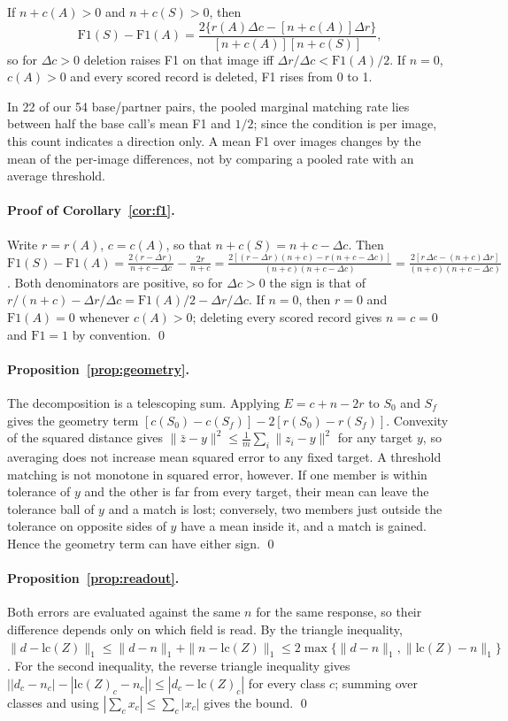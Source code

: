 \begin{corollary}\label{cor:f1}
If $n+c(A)>0$ and $n+c(S)>0$, then
\[
\mathrm{F1}(S)-\mathrm{F1}(A)=\frac{2\{r(A)\Delta c-[n+c(A)]\Delta r\}}{[n+c(A)][n+c(S)]},
\]
so for $\Delta c>0$ deletion raises F1 on that image iff $\Delta r/\Delta c<\mathrm{F1}(A)/2$. If $n=0$, $c(A)>0$ and every scored record is deleted, F1 rises from 0 to 1.
\end{corollary}
In 22 of our 54 base/partner pairs, the pooled marginal matching rate lies between half the base call's mean F1 and $1/2$; since the condition is per image, this count indicates a direction only. A mean F1 over images changes by the mean of the per-image differences, not by comparing a pooled rate with an average threshold.

\paragraph{Proof of Corollary~\ref{cor:f1}.} Write $r=r(A)$, $c=c(A)$, so that $n+c(S)=n+c-\Delta c$. Then $\mathrm{F1}(S)-\mathrm{F1}(A)=\frac{2(r-\Delta r)}{n+c-\Delta c}-\frac{2r}{n+c}=\frac{2[(r-\Delta r)(n+c)-r(n+c-\Delta c)]}{(n+c)(n+c-\Delta c)}=\frac{2[r\,\Delta c-(n+c)\Delta r]}{(n+c)(n+c-\Delta c)}$. Both denominators are positive, so for $\Delta c>0$ the sign is that of $r/(n+c)-\Delta r/\Delta c=\mathrm{F1}(A)/2-\Delta r/\Delta c$. If $n=0$, then $r=0$ and $\mathrm{F1}(A)=0$ whenever $c(A)>0$; deleting every scored record gives $n=c=0$ and $\mathrm{F1}=1$ by convention. \qed

\paragraph{Proposition~\ref{prop:geometry}.} The decomposition is a telescoping sum. Applying $E=c+n-2r$ to $S_0$ and $S_f$ gives the geometry term $[c(S_0)-c(S_f)]-2[r(S_0)-r(S_f)]$. Convexity of the squared distance gives $\|\bar z-y\|^2\le\frac1m\sum_i\|z_i-y\|^2$ for any target $y$, so averaging does not increase mean squared error to any fixed target. A threshold matching is not monotone in squared error, however. If one member is within tolerance of $y$ and the other is far from every target, their mean can leave the tolerance ball of $y$ and a match is lost; conversely, two members just outside the tolerance on opposite sides of $y$ have a mean inside it, and a match is gained. Hence the geometry term can have either sign. \qed

\paragraph{Proposition~\ref{prop:readout}.} Both errors are evaluated against the same $n$ for the same response, so their difference depends only on which field is read. By the triangle inequality, $\|d-\mathrm{lc}(Z)\|_1\le\|d-n\|_1+\|n-\mathrm{lc}(Z)\|_1\le2\max\{\|d-n\|_1,\|\mathrm{lc}(Z)-n\|_1\}$. For the second inequality, the reverse triangle inequality gives $\big||d_c-n_c|-|\mathrm{lc}(Z)_c-n_c|\big|\le|d_c-\mathrm{lc}(Z)_c|$ for every class $c$; summing over classes and using $|\sum_c x_c|\le\sum_c|x_c|$ gives the bound. \qed

